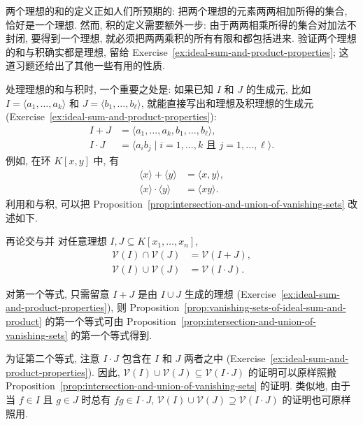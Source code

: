 两个理想的和的定义正如人们所预期的: 把两个理想的元素两两相加所得的集合, 恰好是一个理想. 然而, 积的定义需要额外一步: 由于两两相乘所得的集合对加法不封闭, 要得到一个理想, 就必须把两两乘积的所有有限和都包括进来. 验证两个理想的和与积确实都是理想, 留给 Exercise~\ref{ex:ideal-sum-and-product-properties}; 这道习题还给出了其他一些有用的性质.

处理理想的和与积时, 一个重要之处是: 如果已知 $I$ 和 $J$ 的生成元, 比如 $I=\langle a_{1},\ldots,a_{k}\rangle$ 和 $J=\langle b_{1},\ldots,b_{\ell}\rangle$, 就能直接写出和理想及积理想的生成元 (Exercise~\ref{ex:ideal-sum-and-product-properties}):
\[
  \begin{aligned}
    I+J&=\langle a_{1},\ldots,a_{k},b_{1},\ldots,b_{\ell}\rangle,\\
    I\cdot J&=\langle a_{i}b_{j}\mid i=1,\ldots,k\text{ 且 }j=1,\ldots,\ell\rangle.
  \end{aligned}
\]
例如, 在环 $K[x,y]$ 中, 有
\[
  \begin{aligned}
    \langle x\rangle+\langle y\rangle&=\langle x,y\rangle,\\
    \langle x\rangle\cdot\langle y\rangle&=\langle xy\rangle.
  \end{aligned}
\]
利用和与积, 可以把 Proposition~\ref{prop:intersection-and-union-of-vanishing-sets} 改述如下.

\begin{Proposition}{再论交与并}\leavevmode\label{prop:vanishing-sets-of-ideal-sum-and-product}
  对任意理想 $I,J\subseteq K[x_{1},\ldots,x_{n}]$,
  \[
    \begin{aligned}
      \mathcal{V}(I)\cap\mathcal{V}(J)&=\mathcal{V}(I+J),\\
      \mathcal{V}(I)\cup\mathcal{V}(J)&=\mathcal{V}(I\cdot J).
    \end{aligned}
  \]
\end{Proposition}

\begin{Proof}
  对第一个等式, 只需留意 $I+J$ 是由 $I\cup J$ 生成的理想 (Exercise~\ref{ex:ideal-sum-and-product-properties}), 则 Proposition~\ref{prop:vanishing-sets-of-ideal-sum-and-product} 的第一个等式可由 Proposition~\ref{prop:intersection-and-union-of-vanishing-sets} 的第一个等式得到.

  为证第二个等式, 注意 $I\cdot J$ 包含在 $I$ 和 $J$ 两者之中 (Exercise~\ref{ex:ideal-sum-and-product-properties}). 因此, $\mathcal{V}(I)\cup\mathcal{V}(J)\subseteq\mathcal{V}(I\cdot J)$ 的证明可以原样照搬 Proposition~\ref{prop:intersection-and-union-of-vanishing-sets} 的证明. 类似地, 由于当 $f\in I$ 且 $g\in J$ 时总有 $fg\in I\cdot J$, $\mathcal{V}(I)\cup\mathcal{V}(J)\supseteq\mathcal{V}(I\cdot J)$ 的证明也可原样照用.
\end{Proof}


